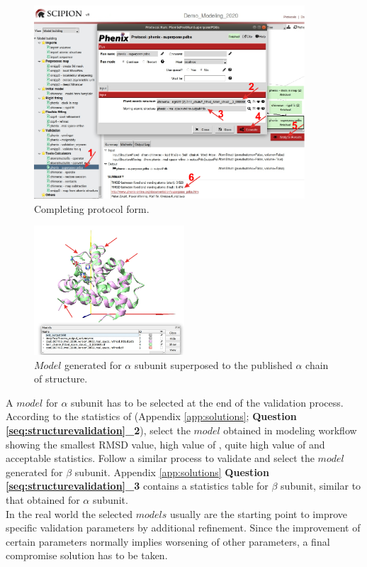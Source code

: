 \begin{itemize}
  \begin{figure}[H]
    \centering 
    \captionsetup{width=.9\linewidth} 
    \includegraphics[width=0.90\textwidth]{Images/Fig37}
    \caption{Completing \phenix {} protocol form.}
    \label{fig:superpose_pdbs_protocol}
    \end{figure}

 
   \begin{figure}[H]
    \centering 
    \captionsetup{width=.9\linewidth} 
    \includegraphics[width=0.50\textwidth]{Images/Fig38}
    \caption{$Model$ generated for  $\alpha$ subunit superposed to the published $\alpha$ chain of  structure.}
    \label{fig:superpose_pdbs_chimera}
   \end{figure}
  
  
  \end{itemize}
 
 A $model$ for  $\alpha$ subunit has to be selected at the end of the validation process. According to the statistics of  (Appendix \ref{app:solutions}; \textbf{Question \ref{seq:structurevalidation}\_2}), select the $model$ obtained in modeling workflow showing the smallest RMSD value, high value of \emringer {}, quite high value of \ccmask and acceptable \molprobity statistics. Follow a similar process to validate and select the $model$ generated for  $\beta$ subunit. Appendix \ref{app:solutions} \textbf{Question \ref{seq:structurevalidation}\_3} contains a statistics table for  $\beta$ subunit, similar to that obtained for  $\alpha$ subunit.\\
 
 In the real world the selected $models$ usually are the starting point to improve specific validation parameters by additional refinement. Since the improvement of certain parameters normally implies worsening of other parameters, a final compromise solution has to be taken.\\

